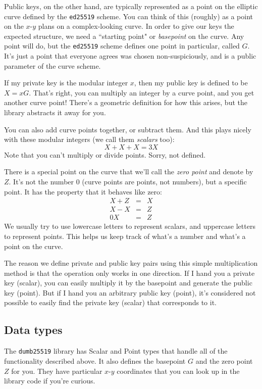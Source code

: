 \documentclass{article}
\begin{document}
Public keys, on the other hand, are typically represented as a point on the elliptic curve defined by the \texttt{ed25519} scheme. You can think of this (roughly) as a point on the $x$-$y$ plans on a complex-looking curve. In order to give our keys the expected structure, we need a ``starting point" or \textit{basepoint} on the curve. Any point will do, but the \texttt{ed25519} scheme defines one point in particular, called $G$. It's just a point that everyone agrees was chosen non-suspiciously, and is a public parameter of the curve scheme.

If my private key is the modular integer $x$, then my public key is defined to be $X = xG$. That's right, you can multiply an integer by a curve point, and you get another curve point! There's a geometric definition for how this arises, but the library abstracts it away for you.

You can also add curve points together, or subtract them. And this plays nicely with these modular integers (we call them \textit{scalars} too): $$X + X + X = 3X$$
Note that you can't multiply or divide points. Sorry, not defined.

There is a special point on the curve that we'll call the \textit{zero point} and denote by $Z$. It's not the number $0$ (curve points are points, not numbers), but a specific point. It has the property that it behaves like zero:
\begin{eqnarray*}
X + Z &=& X \\
X - X &=& Z \\
0X &=& Z
\end{eqnarray*}
We usually try to use lowercase letters to represent scalars, and uppercase letters to represent points. This helps us keep track of what's a number and what's a point on the curve.

The reason we define private and public key pairs using this simple multiplication method is that the operation only works in one direction. If I hand you a private key (scalar), you can easily multiply it by the basepoint and generate the public key (point). But if I hand you an arbitrary public key (point), it's considered not possible to easily find the private key (scalar) that corresponds to it.

\subsection{Data types}
The \texttt{dumb25519} library has Scalar and Point types that handle all of the functionality described above. It also defines the basepoint $G$ and the zero point $Z$ for you. They have particular $x$-$y$ coordinates that you can look up in the library code if you're curious.
\end{document}
